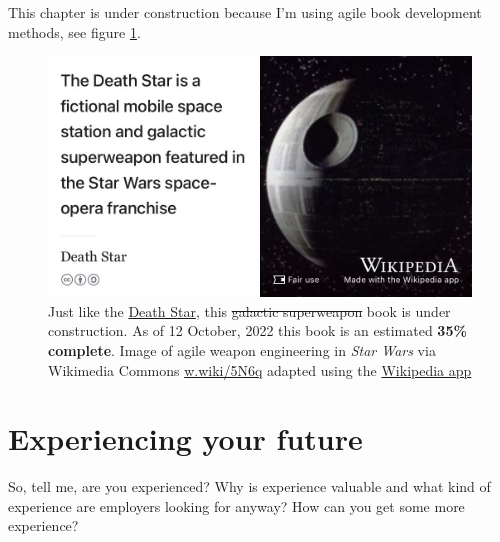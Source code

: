 \documentclass[
]{book}
\begin{document}
This chapter is under construction because I'm using agile book development methods, see figure \ref{fig:deathstar-fig}.

\begin{figure}

{\centering \includegraphics[width=0.99\linewidth]{images/DeathStar2} 

}

\caption{Just like the \href{https://en.wikipedia.org/wiki/Death_Star}{Death Star}, this \sout{galactic superweapon} book is under construction. As of 12 October, 2022 this book is an estimated \textbf{35\% complete}. Image of agile weapon engineering in \emph{Star Wars} via Wikimedia Commons \href{https://w.wiki/5N6q}{w.wiki/5N6q} adapted using the \href{https://apps.apple.com/gb/app/wikipedia/id324715238}{Wikipedia app}}\label{fig:deathstar-fig}
\end{figure}



\hypertarget{experiencing}{%
\chapter{Experiencing your future}\label{experiencing}}

So, tell me, are you experienced? Why is experience valuable and what kind of experience are employers looking for anyway? How can you get some more experience? 🤔
\end{document}
